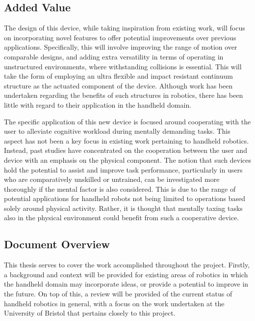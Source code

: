 \documentclass[11pt]{article}
\begin{document}
\subsection{Added Value}
The design of this device, while taking inspiration from existing work, will focus on incorporating novel features to offer potential improvements over previous applications. Specifically, this will involve improving the range of motion over comparable designs, and adding extra versatility in terms of operating in unstructured environments, where withstanding collisions is essential. This will take the form of employing an ultra flexible and impact resistant continuum structure as the actuated component of the device. Although work has been undertaken regarding the benefits of such structures in robotics, there has been little with regard to their application in the handheld domain.

The specific application of this new device is focused around cooperating with the user to alleviate cognitive workload during mentally demanding tasks. This aspect has not been a key focus in existing work pertaining to handheld robotics. Instead, past studies have concentrated on the cooperation between the user and device with an emphasis on the physical component. The notion that such devices hold the potential to assist and improve task performance, particularly in users who are comparatively unskilled or untrained, can be investigated more thoroughly if the mental factor is also considered. This is due to the range of potential applications for handheld robots not being limited to operations based solely around physical activity. Rather, it is thought that mentally taxing tasks also in the physical environment could benefit from such a cooperative device.

\subsection{Document Overview}
This thesis serves to cover the work accomplished throughout the project. Firstly, a background and context will be provided for existing areas of robotics in which the handheld domain may incorporate ideas, or provide a potential to improve in the future. On top of this, a review will be provided of the current status of handheld robotics in general, with a focus on the work undertaken at the University of Bristol that pertains closely to this project.
\end{document}
